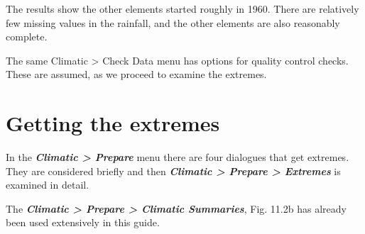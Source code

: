 \documentclass[
  letterpaper,
  DIV=11,
  numbers=noendperiod]{scrreprt}
\begin{document}
The results show the other elements started roughly in 1960. There are
relatively few missing values in the rainfall, and the other elements
are also reasonably complete.

The same Climatic \textgreater{} Check Data menu has options for quality
control checks. These are assumed, as we proceed to examine the
extremes.

\section{Getting the extremes}\label{getting-the-extremes}

In the \textbf{\emph{Climatic \textgreater{} Prepare}} menu there are
four dialogues that get extremes. They are considered briefly and then
\textbf{\emph{Climatic \textgreater{} Prepare \textgreater{} Extremes}}
is examined in detail.

The \textbf{\emph{Climatic \textgreater{} Prepare \textgreater{}
Climatic Summaries}}, Fig. 11.2b has already been used extensively in
this guide.
\end{document}
